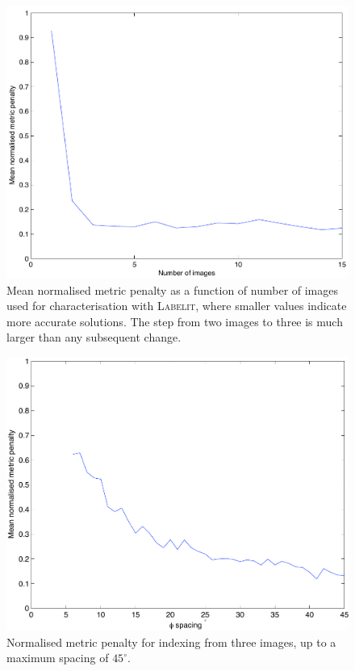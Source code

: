 \documentclass[preprint,pdf]{iucr}
\begin{document}
\begin{figure}
\caption{Mean normalised metric penalty as a function of number of
  images used for characterisation with \textsc{Labelit}, where smaller values
  indicate more accurate solutions. The step from two images to three
  is much larger than any subsequent change.
\label{figure:no_images}}
\centering
\includegraphics[scale=0.5]{figures/no_images.pdf}
\end{figure}

\begin{figure}
\caption{Normalised metric penalty for indexing from three images, up
  to a maximum spacing of $45^{\circ}$.
\label{figure:phi_spacing_45a}}
\centering
\includegraphics[scale=0.5]{figures/phi_spacing_45a.pdf}
\end{figure}
\end{document}

